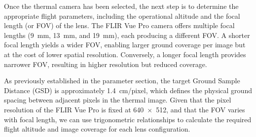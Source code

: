 Once the thermal camera has been selected, the next step is to determine the appropriate flight parameters, including the operational altitude and the focal length (or FOV) of the lens. The FLIR Vue Pro camera offers multiple focal lengths (9~mm, 13~mm, and 19~mm), each producing a different FOV. A shorter focal length yields a wider FOV, enabling larger ground coverage per image but at the cost of lower spatial resolution. Conversely, a longer focal length provides narrower FOV, resulting in higher resolution but reduced coverage.

As previously established in the parameter section, the target Ground Sample Distance (GSD) is approximately 1.4~cm/pixel, which defines the physical ground spacing between adjacent pixels in the thermal image. Given that the pixel resolution of the FLIR Vue Pro is fixed at 640~×~512, and that the FOV varies with focal length, we can use trigonometric relationships to calculate the required flight altitude and image coverage for each lens configuration.



